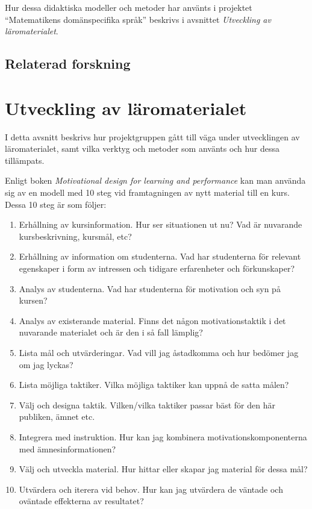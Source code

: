 \documentclass[]{article}
\begin{document}
Hur dessa didaktiska modeller och metoder har använts i projektet
``Matematikens domänspecifika språk'' beskrivs i avsnittet
\textit{Utveckling av läromaterialet}.

\subsection{Relaterad forskning}

\section{Utveckling av läromaterialet}



I detta avsnitt beskrivs hur projektgruppen gått till väga under utvecklingen av läromaterialet, samt vilka verktyg och
metoder som använts och hur dessa tillämpats.

Enligt boken \textit{Motivational design for learning and performance} kan man använda sig av en modell med 10 steg vid
framtagningen av nytt material till en kurs. Dessa 10 steg är som följer:

\begin{enumerate}
  \item Erhållning av kursinformation. Hur ser situationen ut nu? Vad är nuvarande kursbeskrivning, kursmål, etc?
  \item Erhållning av information om studenterna. Vad har studenterna för relevant egenskaper i form av intressen och
  tidigare erfarenheter och förkunskaper?
  \item Analys av studenterna. Vad har studenterna för motivation och syn på kursen?
  \item Analys av existerande material. Finns det någon motivationstaktik i det nuvarande materialet och är den i så
  fall lämplig?
  \item Lista mål och utvärderingar. Vad vill jag åstadkomma och hur bedömer jag om jag lyckas?
  \item Lista möjliga taktiker. Vilka möjliga taktiker kan uppnå de satta målen?
  \item Välj och designa taktik. Vilken/vilka taktiker passar bäst för den här publiken, ämnet etc.
  \item Integrera med instruktion. Hur kan jag kombinera motivationskomponenterna med ämnesinformationen?
  \item Välj och utveckla material. Hur hittar eller skapar jag material för dessa mål?
  \item Utvärdera och iterera vid behov. Hur kan jag utvärdera de väntade och oväntade effekterna av resultatet?
\end{enumerate}
\end{document}
